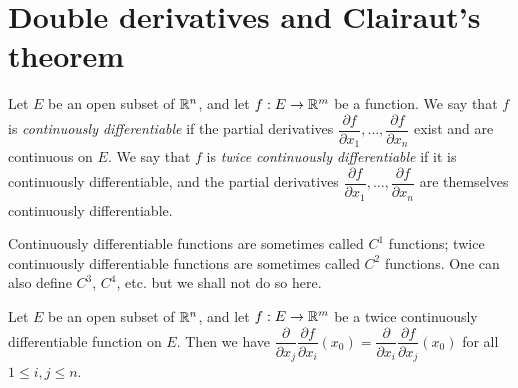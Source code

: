 \section{Double derivatives and Clairaut's theorem}\label{sec:6.5}

\begin{defn}\label{6.5.1}
  Let \(E\) be an open subset of \(\mathbb{R}^n\), and let \(f : E \to \mathbb{R}^m\) be a function.
  We say that \(f\) is \emph{continuously differentiable} if the partial derivatives \(\dfrac{\partial f}{\partial x_1}, \dots, \dfrac{\partial f}{\partial x_n}\) exist and are continuous on \(E\).
  We say that \(f\) is \emph{twice continuously differentiable} if it is continuously differentiable, and the partial derivatives \(\dfrac{\partial f}{\partial x_1}, \dots, \dfrac{\partial f}{\partial x_n}\) are themselves continuously differentiable.
\end{defn}

\begin{rmk}\label{6.5.2}
  Continuously differentiable functions are sometimes called \(C^1\) functions;
  twice continuously differentiable functions are sometimes called \(C^2\) functions.
  One can also define \(C^3\), \(C^4\), etc. but we shall not do so here.
\end{rmk}

\setcounter{thm}{3}
\begin{thm}\label{6.5.4}
  Let \(E\) be an open subset of \(\mathbb{R}^n\), and let \(f : E \to \mathbb{R}^m\) be a twice continuously differentiable function on \(E\).
  Then we have \(\dfrac{\partial}{\partial x_j} \dfrac{\partial f}{\partial x_i}(x_0) = \dfrac{\partial}{\partial x_i} \dfrac{\partial f}{\partial x_j}(x_0)\) for all \(1 \leq i, j \leq n\).
\end{thm}

